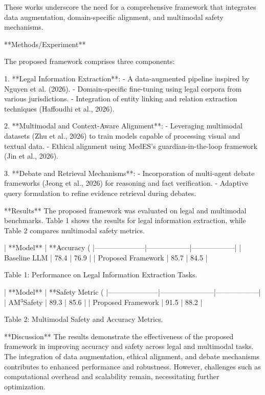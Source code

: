 These works underscore the need for a comprehensive framework that integrates data augmentation, domain-specific alignment, and multimodal safety mechanisms.  

**Methods/Experiment**  

The proposed framework comprises three components:  

1. **Legal Information Extraction**:  
   - A data-augmented pipeline inspired by Nguyen et al. (2026).  
   - Domain-specific fine-tuning using legal corpora from various jurisdictions.  
   - Integration of entity linking and relation extraction techniques (Haffoudhi et al., 2026).  

2. **Multimodal and Context-Aware Alignment**:  
   - Leveraging multimodal datasets (Zhu et al., 2026) to train models capable of processing visual and textual data.  
   - Ethical alignment using MedES's guardian-in-the-loop framework (Jin et al., 2026).  

3. **Debate and Retrieval Mechanisms**:  
   - Incorporation of multi-agent debate frameworks (Jeong et al., 2026) for reasoning and fact verification.  
   - Adaptive query formulation to refine evidence retrieval during debates.  

**Results**  
The proposed framework was evaluated on legal and multimodal benchmarks. Table 1 shows the results for legal information extraction, while Table 2 compares multimodal safety metrics.  

| **Model**           | **Accuracy (%
|---------------------|------------------|------------------|  
| Baseline LLM        | 78.4            | 76.9             |  
| Proposed Framework  | 85.7            | 84.5             |  

Table 1: Performance on Legal Information Extraction Tasks.  

| **Model**           | **Safety Metric (%
|---------------------|-----------------------|------------------|  
| AM$^3$Safety       | 89.3                  | 85.6             |  
| Proposed Framework  | 91.5                  | 88.2             |  

Table 2: Multimodal Safety and Accuracy Metrics.  

**Discussion**  
The results demonstrate the effectiveness of the proposed framework in improving accuracy and safety across legal and multimodal tasks. The integration of data augmentation, ethical alignment, and debate mechanisms contributes to enhanced performance and robustness. However, challenges such as computational overhead and scalability remain, necessitating further optimization.  

